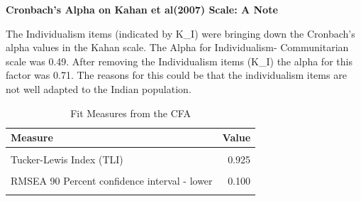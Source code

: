 \documentclass[
]{article}
\begin{document}
\textbf{Cronbach's Alpha on Kahan et al(2007) Scale: A Note}

The Individualism items (indicated by K\_I) were bringing down the
Cronbach's alpha values in the Kahan scale. The Alpha for Individualism-
Communitarian scale was 0.49. After removing the Individualism items
(K\_I) the alpha for this factor was 0.71. The reasons for this could be
that the individualism items are not well adapted to the Indian
population.

\begin{table}[!h]

\caption{\label{tab:unnamed-chunk-18}Fit Measures from the CFA}
\centering
\begin{tabular}[t]{lr}
\toprule
Measure & Value\\
\midrule
\cellcolor{gray!6}{Comparative Fit Index (CFI)} & \cellcolor{gray!6}{0.954}\\
Tucker-Lewis Index (TLI) & 0.925\\
\cellcolor{gray!6}{Root Mean Square Error of Approximation(RMSEA)} & \cellcolor{gray!6}{0.074}\\
RMSEA 90 Percent confidence interval - lower & 0.100\\
\cellcolor{gray!6}{RMSEA 90 Percent confidence interval - upper} & \cellcolor{gray!6}{0.050}\\
\bottomrule
\end{tabular}
\end{table}

\newpage
\end{document}
